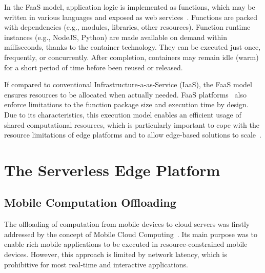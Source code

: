 \documentclass[letterpaper, 10 pt, conference]{ieeeconf}  %
\begin{document}
In the FaaS model, application logic is implemented as functions, which may be written in various languages and exposed as web services~\cite{}. Functions are packed with dependencies (e.g., modules, libraries, other resources). Function runtime instances (e.g., NodeJS, Python) are made available on demand within milliseconds, thanks to the container technology. They can be executed just once, frequently, or concurrently. After completion, containers may remain idle (warm) for a short period of time before been reused or released. 

If compared to conventional Infrastructure-a-as-Service (IaaS), the FaaS model ensures resources to be allocated when actually needed. FaaS platforms~\cite{} also enforce limitations to the function package size and execution time by design. Due to its characteristics, this execution model enables an efficient usage of shared computational resources, which is particularly important to cope with the resource limitations of edge platforms and to allow edge-based solutions to scale~\cite{}.





%




\section{The Serverless Edge Platform}\label{sec:SEP}

\subsection{Mobile Computation Offloading}\label{sec:SEP_MCO}

The offloading of computation from mobile devices to cloud servers was firstly addressed by the concept of Mobile Cloud Computing~\cite{Khan:14}. Its main purpose was to enable rich mobile applications to be executed in resource-constrained mobile devices. However, this approach is limited by network latency, which is prohibitive for most real-time and interactive applications.
\end{document}
